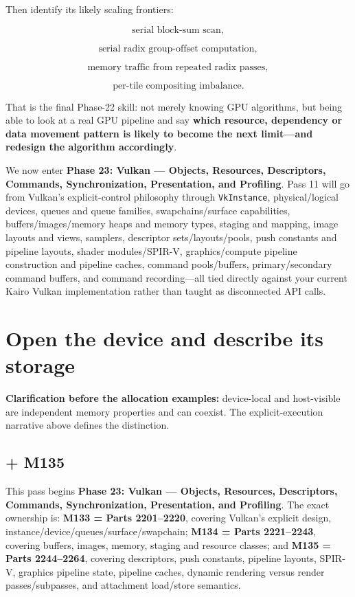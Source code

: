 Then identify its likely scaling frontiers:

\[
\text{serial block-sum scan},
\]

\[
\text{serial radix group-offset computation},
\]

\[
\text{memory traffic from repeated radix passes},
\]

\[
\text{per-tile compositing imbalance}.
\]

That is the final Phase-22 skill: not merely knowing GPU algorithms, but being able to look at a real GPU pipeline and say \textbf{which resource, dependency or data movement pattern is likely to become the next limit---and redesign the algorithm accordingly}.

We now enter \textbf{Phase 23: Vulkan --- Objects, Resources, Descriptors, Commands, Synchronization, Presentation, and Profiling}. Pass 11 will go from Vulkan's explicit-control philosophy through \texttt{VkInstance}, physical/logical devices, queues and queue families, swapchains/surface capabilities, buffers/images/memory heaps and memory types, staging and mapping, image layouts and views, samplers, descriptor sets/layouts/pools, push constants and pipeline layouts, shader modules/SPIR-V, graphics/compute pipeline construction and pipeline caches, command pools/buffers, primary/secondary command buffers, and command recording---all tied directly against your current Kairo Vulkan implementation rather than taught as disconnected API calls.

\section{Open the device and describe its storage}\label{05-engine-i-ch020-open-the-device-and-describe-its-storage}

\textbf{Clarification before the allocation examples:} device-local and host-visible are independent memory properties and can coexist. The explicit-execution narrative above defines the distinction.

\subsection{+ M135}\label{05-engine-i-ch020-m135}

This pass begins \textbf{Phase 23: Vulkan --- Objects, Resources, Descriptors, Commands, Synchronization, Presentation, and Profiling}. The exact ownership is: \textbf{M133 = Parts 2201--2220}, covering Vulkan's explicit design, instance/device/queues/surface/swapchain; \textbf{M134 = Parts 2221--2243}, covering buffers, images, memory, staging and resource classes; and \textbf{M135 = Parts 2244--2264}, covering descriptors, push constants, pipeline layouts, SPIR-V, graphics pipeline state, pipeline caches, dynamic rendering versus render passes/subpasses, and attachment load/store semantics.

